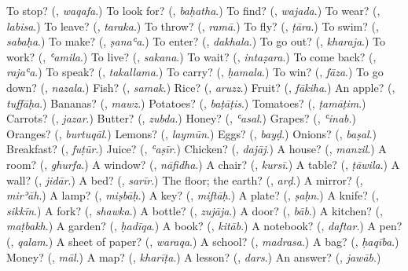 \begin{tcolorbox}[breakable,colback=teal!4,colframe=teal!35!black,title={Before you move on}]
To stop? (\textbf{}, \emph{waqafa}.) To look for? (\textbf{}, \emph{baḥatha}.) To find? (\textbf{}, \emph{wajada}.) To wear? (\textbf{}, \emph{labisa}.) To leave? (\textbf{}, \emph{taraka}.) To throw? (\textbf{}, \emph{ramā}.) To fly? (\textbf{}, \emph{ṭāra}.) To swim? (\textbf{}, \emph{sabaḥa}.) To make? (\textbf{}, \emph{ṣanaʿa}.) To enter? (\textbf{}, \emph{dakhala}.) To go out? (\textbf{}, \emph{kharaja}.) To work? (\textbf{}, \emph{ʿamila}.) To live? (\textbf{}, \emph{sakana}.) To wait? (\textbf{}, \emph{intaẓara}.) To come back? (\textbf{}, \emph{rajaʿa}.) To speak? (\textbf{}, \emph{takallama}.) To carry? (\textbf{}, \emph{ḥamala}.) To win? (\textbf{}, \emph{fāza}.) To go down? (\textbf{}, \emph{nazala}.) Fish? (\textbf{}, \emph{samak}.) Rice? (\textbf{}, \emph{aruzz}.) Fruit? (\textbf{}, \emph{fākiha}.) An apple? (\textbf{}, \emph{tuffāḥa}.) Bananas? (\textbf{}, \emph{mawz}.) Potatoes? (\textbf{}, \emph{baṭāṭis}.) Tomatoes? (\textbf{}, \emph{ṭamāṭim}.) Carrots? (\textbf{}, \emph{jazar}.) Butter? (\textbf{}, \emph{zubda}.) Honey? (\textbf{}, \emph{ʿasal}.) Grapes? (\textbf{}, \emph{ʿinab}.) Oranges? (\textbf{}, \emph{burtuqāl}.) Lemons? (\textbf{}, \emph{laymūn}.) Eggs? (\textbf{}, \emph{bayḍ}.) Onions? (\textbf{}, \emph{baṣal}.) Breakfast? (\textbf{}, \emph{fuṭūr}.) Juice? (\textbf{}, \emph{ʿaṣīr}.) Chicken? (\textbf{}, \emph{dajāj}.) A house? (\textbf{}, \emph{manzil}.) A room? (\textbf{}, \emph{ghurfa}.) A window? (\textbf{}, \emph{nāfidha}.) A chair? (\textbf{}, \emph{kursī}.) A table? (\textbf{}, \emph{ṭāwila}.) A wall? (\textbf{}, \emph{jidār}.) A bed? (\textbf{}, \emph{sarīr}.) The floor; the earth? (\textbf{}, \emph{arḍ}.) A mirror? (\textbf{}, \emph{mirʾāh}.) A lamp? (\textbf{}, \emph{miṣbāḥ}.) A key? (\textbf{}, \emph{miftāḥ}.) A plate? (\textbf{}, \emph{ṣaḥn}.) A knife? (\textbf{}, \emph{sikkīn}.) A fork? (\textbf{}, \emph{shawka}.) A bottle? (\textbf{}, \emph{zujāja}.) A door? (\textbf{}, \emph{bāb}.) A kitchen? (\textbf{}, \emph{maṭbakh}.) A garden? (\textbf{}, \emph{ḥadīqa}.) A book? (\textbf{}, \emph{kitāb}.) A notebook? (\textbf{}, \emph{daftar}.) A pen? (\textbf{}, \emph{qalam}.) A sheet of paper? (\textbf{}, \emph{waraqa}.) A school? (\textbf{}, \emph{madrasa}.) A bag? (\textbf{}, \emph{ḥaqība}.) Money? (\textbf{}, \emph{māl}.) A map? (\textbf{}, \emph{kharīṭa}.) A lesson? (\textbf{}, \emph{dars}.) An answer? (\textbf{}, \emph{jawāb}.)
\end{tcolorbox}
